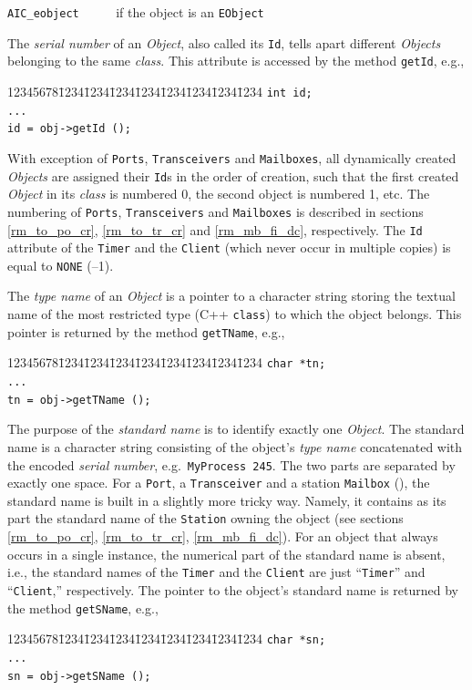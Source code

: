 \noindent
{\tt AIC\_eobject~~~~~} if the object is an {\tt EObject}

\bigskip

The {\em serial number\/}
of an {\em Object}, also called its {\tt Id}, tells apart
different {\em Objects\/} belonging to the same {\em class}.
This attribute is accessed by the method {\tt getId}, e.g.,
{\tt\begin{tabbing}
12345678\=1234\=1234\=1234\=1234\=1234\=1234\=1234\=1234\kill
 \> {\tt int  id;}\\
 \> {\tt ...}\\
 \> {\tt id = obj->getId ();}
\end{tabbing}}

With exception of {\tt Ports}, {\tt Transceivers} and {\tt Mailboxes},
all dynamically created
{\em Objects\/} are assigned their {\tt Id}s in the order of creation, such
that the first created {\em Object\/} in its {\em class} is numbered 0,
the second object is numbered 1, etc.
The numbering of {\tt Ports}, {\tt Transceivers} and {\tt Mailboxes}
is described in sections \ref{rm_to_po_cr}, \ref{rm_to_tr_cr} and
\ref{rm_mb_fi_dc}, respectively.
The {\tt Id} attribute of
the {\tt Timer} and the {\tt Client} (which never occur in multiple copies)
is equal to {\tt NONE} (--1).

The {\em type name\/} of an {\em Object\/} is a pointer to a character string
storing the textual name of the most restricted
type (C++ {\tt class}) to which the object belongs.
This pointer is returned by the method
{\tt getTName}, e.g.,
{\tt\begin{tabbing}
12345678\=1234\=1234\=1234\=1234\=1234\=1234\=1234\=1234\kill
 \> {\tt char *tn;}\\
 \> {\tt ...}\\
 \> {\tt tn = obj->getTName ();}
\end{tabbing}}

The purpose of the {\em standard name\/} is to identify exactly one
{\em Object}.
The standard name is a character string consisting of the object's
{\em type name\/} concatenated with the encoded {\em serial number}, e.g.\ 
{\tt MyProcess~245}.
The two parts are separated by exactly one space.
For a {\tt Port}, a {\tt Transceiver} and a station {\tt Mailbox}
(\sect{rm_mb_fi_dc}),
the standard name is built in a slightly more tricky way.
Namely, it contains as its part the standard name of the {\tt Station}
owning the object (see sections \ref{rm_to_po_cr}, \ref{rm_to_tr_cr},
\ref{rm_mb_fi_dc}).
For an object that always occurs in a single instance, the numerical part of
the standard name is absent, i.e., the standard names of the {\tt Timer}
and the {\tt Client} are just ``{\tt Timer}'' and ``{\tt Client},''
respectively.
The pointer to the object's standard name is returned by the method
{\tt getSName}, e.g.,
{\tt\begin{tabbing}
12345678\=1234\=1234\=1234\=1234\=1234\=1234\=1234\=1234\kill
 \> {\tt char *sn;}\\
 \> {\tt ...}\\
 \> {\tt sn = obj->getSName ();}
\end{tabbing}}

